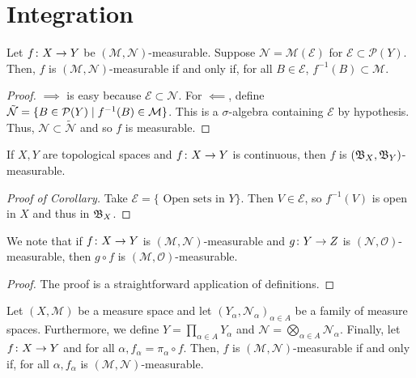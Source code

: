 \documentclass[11pt,leqno,oneside]{amsbook}
\numberwithin{thm}{section}
\renewcommand{\P}{\mathcal{P}} %
\newcommand{\M}{\mathcal{M}} %
\newcommand{\Ep}{\mathcal{E}} %
\newcommand{\s}{$\sigma$-} %
\begin{document}
  \section{Integration}
  \begin{prop}
    Let $f \colon X \to Y$ be $(\M,\mathcal{N})$-measurable. Suppose
    $\mathcal{N} = \M(\Ep)$ for $\Ep \subset \P(Y)$. Then, $f$
    is $(\M,\mathcal{N})$-measurable if and only if, for all $B \in
    \Ep$, $f^{-1}(B) \subset \M$.
  \end{prop}
  \begin{proof}
    $\implies$ is easy because $\Ep \subset \mathcal{N}$. For
    $\impliedby$, define $\tilde{\mathcal{N}} = \{B \in \P(Y) \st f^{-1}(B)
    \in \M\}$. This is a \s algebra containing $\Ep$ by
    hypothesis. Thus, $\mathcal{N} \subset \tilde{\mathcal{N}}$ and so $f$ is
    measurable.
  \end{proof}
  \begin{cor}
    If $X,Y$ are topological spaces and $f \colon X \to Y$ is
    continuous, then $f$ is $(\mathfrak{B}_X, \mathfrak{B}_Y)$-measurable.
  \end{cor}
  \begin{proof}[Proof of Corollary]
    Take $\Ep = \{\text{ Open sets in }Y\}$. Then $V \in \Ep$, so
    $f^{-1}(V)$ is open in $X$ and thus in $\mathfrak{B}_X$.
  \end{proof}
  \begin{prop}
    We note that if $f \colon X \to Y$ is $(\M,\mathcal{N})$-measurable
    and $g \colon Y \to Z$ is $(\mathcal{N},\mathcal{O})$-measurable,
    then $g \circ f$ is $(\M,\mathcal{O})$-measurable.
  \end{prop}
  \begin{proof}
    The proof is a straightforward application of definitions.
  \end{proof}
  \begin{prop}
    Let $(X,\M)$ be a measure space and let $(Y_\alpha,
    \mathcal{N}_\alpha)_{\alpha \in A}$ be a family of measure spaces. Furthermore, we define
    $Y = \prod_{\alpha \in A} Y_\alpha$ and $\mathcal{N} = \bigotimes_{\alpha
      \in A} \mathcal{N}_\alpha$. Finally, let $f \colon X \to Y$ and
    for all $\alpha, f_\alpha = \pi_\alpha \circ f$. Then, $f$ is
    $(\M,\mathcal{N})$-measurable if and only if, for all $\alpha,
    f_\alpha$ is $(\M,\mathcal{N})$-measurable.
  \end{prop}
\end{document}
